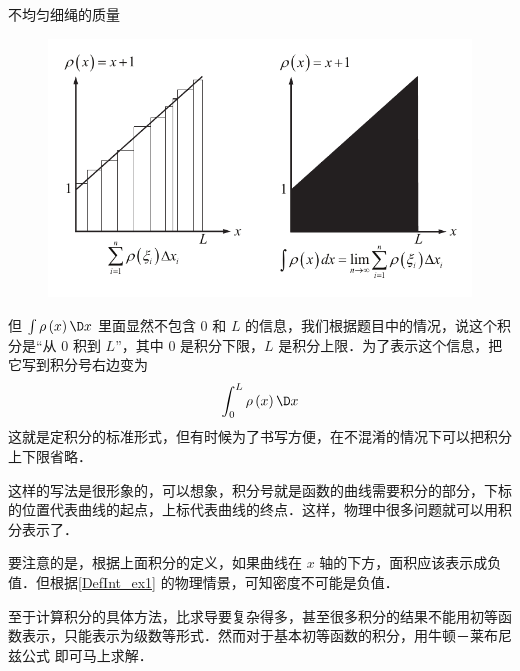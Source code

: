 \begin{exam}{不均匀细绳的质量}
\begin{figure}[h]
\centering
\includegraphics[width=12cm]{./figures/Defint2.pdf}
\end{figure}

但 $\int {\rho \left( x \right)\D x} $ 里面显然不包含 $0$ 和 $L$ 的信息，我们根据题目中的情况，说这个积分是“从 $0$ 积到 $L$”，其中 $0$ 是积分下限，$L$ 是积分上限．为了表示这个信息，把它写到积分号右边变为
\begin{equation}
\int_0^L {\rho \left( x \right)\D x} 
\end{equation}
这就是定积分的标准形式，但有时候为了书写方便，在不混淆的情况下可以把积分上下限省略．
\end{exam}

这样的写法是很形象的，可以想象，积分号就是函数的曲线需要积分的部分，下标的位置代表曲线的起点，上标代表曲线的终点．这样，物理中很多问题就可以用积分表示了．

要注意的是，根据上面积分的定义，如果曲线在 $x$ 轴的下方，面积应该表示成负值．但根据\autoref{DefInt_ex1} 的物理情景，可知密度不可能是负值．

至于计算积分的具体方法，比求导要复杂得多，甚至很多积分的结果不能用初等函数表示，只能表示为级数等形式．然而对于基本初等函数的积分，用牛顿－莱布尼兹公式 即可马上求解．

